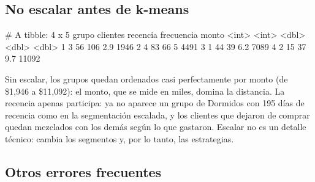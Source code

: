 \subsection{No escalar antes de k-means}


\begin{rsalida}
# A tibble: 4 x 5
  grupo clientes recencia frecuencia monto
  <int>    <int>    <dbl>      <dbl> <dbl>
1     3       56      106        2.9  1946
2     4       83       66        5    4491
3     1       44       39        6.2  7089
4     2       15       37        9.7 11092
\end{rsalida}

Sin escalar, los grupos quedan ordenados casi perfectamente por monto (de
\$1{,}946 a \$11{,}092): el monto, que se mide en miles, domina la distancia.
La recencia apenas participa: ya no aparece un grupo de Dormidos con 195 días
de recencia como en la segmentación escalada, y los clientes que dejaron de
comprar quedan mezclados con los demás según lo que gastaron. Escalar no es un
detalle técnico: cambia los segmentos y, por lo tanto, las estrategias.

\subsection{Otros errores frecuentes}

